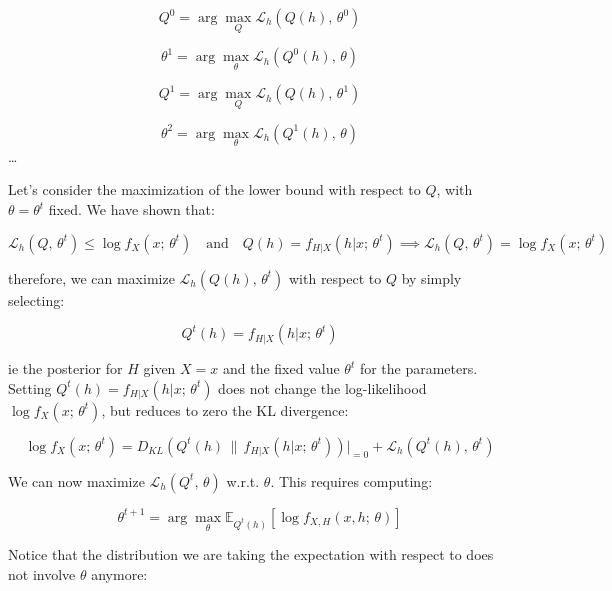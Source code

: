 \begin{equation*}
Q^0 = \arg\max_Q \mathcal{L}_h(Q(h),\,\theta^0)
\end{equation*}

\begin{equation*}
\theta^1 = \arg\max_\theta \mathcal{L}_h(Q^0(h),\,\theta)
\end{equation*}

\begin{equation*}
Q^1 = \arg\max_Q \mathcal{L}_h(Q(h),\,\theta^1)
\end{equation*}

\begin{equation*}
\theta^2 = \arg\max_\theta \mathcal{L}_h(Q^1(h),\,\theta)
\end{equation*}
\dots

Let's consider the maximization of the lower bound with respect to $Q$, with $\theta = \theta^t$ fixed. We have shown that:


\begin{equation*}
\mathcal{L}_h(Q,\,\theta^t) \leq \log f_X(x;\,\theta^t)\quad \text{and}\quad Q(h) = f_{H|X}(h|x;\,\theta^t) \implies \mathcal{L}_h(Q,\,\theta^t) = \log f_X(x;\,\theta^t)
\end{equation*}

therefore, we can maximize $\mathcal{L}_h(Q(h),\,\theta^t)$ with respect to $Q$ by simply selecting:


\begin{equation*}
Q^t(h) = f_{H|X}(h|x;\,\theta^t)
\end{equation*}

ie the posterior for $H$ given $X=x$ and the fixed value $\theta^t$ for the parameters. Setting $Q^t(h) = f_{H|X}(h | x;\,\theta^t)$ does not change the log-likelihood $\log f_X(x;\,\theta^t)$, but reduces to zero the KL divergence:


\begin{equation*}
\log f_X(x;\,\theta^t) = D_{KL}(Q^t(h)\,\|\,f_{H|X}(h|x;\,\theta^t))\big|_{=0} + \mathcal{L}_h(Q^t(h),\,\theta^t)
\end{equation*}

We can now maximize $\mathcal{L}_h(Q^t,\,\theta)$ w.r.t. $\theta$. This requires computing:


\begin{equation*}
\theta^{t+1} = \arg\max_\theta \mathbb{E}_{Q^t(h)}[\log f_{X,H}(x,h;\,\theta)]
\end{equation*}

Notice that the distribution we are taking the expectation with respect to does not involve $\theta$ anymore:


